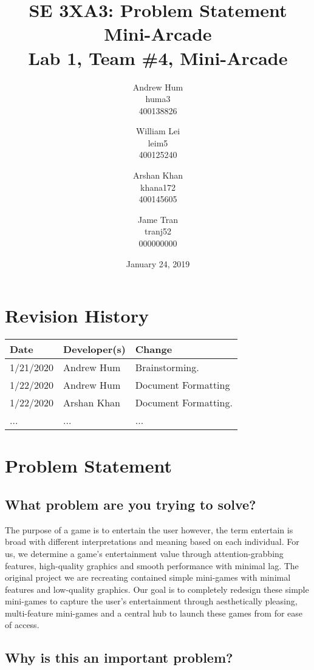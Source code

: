 \documentclass{article}
\title{SE 3XA3: Problem Statement \\ Mini-Arcade \\{\large Lab 1, Team \#4, Mini-Arcade}}
\author{Andrew Hum \\ huma3 \\ 400138826 \and
		William Lei \\ leim5 \\ 400125240 \and
		Arshan Khan \\ khana172 \\ 400145605 \and
		Jame Tran \\ tranj52 \\ 000000000
}
\date{January 24, 2019}
\begin{document}
\maketitle
\newpage

\tableofcontents
\newpage



\begin{table}[hp]
\section{Revision History} \label{TblRevisionHistory}
\begin{tabularx}{\textwidth}{llX}
\hline
\textbf{Date} & \textbf{Developer(s)} & \textbf{Change}\\
\hline
1/21/2020 & Andrew Hum & Brainstorming.\\
\hline
1/22/2020 & Andrew Hum  & Document Formatting\\
\hline
1/22/2020 & Arshan Khan & Document Formatting.\\
\hline
... & ... & ...\\
\hline
\end{tabularx}
\end{table}

\newpage

\section{Problem Statement}
\subsection{What problem are you trying to solve?}
The purpose of a game is to entertain the user however, the term entertain is broad with different interpretations and meaning based on each individual. For us, we determine a game's entertainment value through attention-grabbing features, high-quality graphics and smooth performance with minimal lag. The original project we are recreating contained simple mini-games with minimal features and low-quality graphics. Our goal is to completely redesign these simple mini-games to capture the user's entertainment through aesthetically pleasing, multi-feature mini-games and a central hub to launch these games from for ease of access.

\subsection{Why is this an important problem?}
\end{document}
